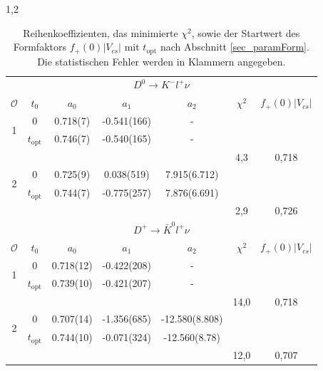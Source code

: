 \documentclass[11pt,a4paper,twoside]{report}
\begin{document}
\begin{spacing}{1,2}
 \renewcommand{\arraystretch}{1.2}
\begin{table}[h]
 \begin{tabular}{cc|ccccc}
 \toprule
  \multicolumn{7}{c}{$D^0 \rightarrow  K^- l^+ \nu$} \\
   $\mathcal{O}$ & $t_0$ & $a_0$ & $a_1$ & $a_2$ & $\chi^2$ & $f_+(0)|V_{cs}|$\\
   \midrule
   \multirow{2}{*}{1} & 0 & 0.718(7) & -0.541(166) & - &  &\\
   & $t_\text{opt}$ & 0.746(7) & -0.540(165) & -\\
   & & & &  & 4,3 &0,718 \\
   \hline
      \multirow{2}{*}{2} & 0 & 0.725(9) & 0.038(519) & 7.915(6.712) & &\\
   & $t_\text{opt}$ & 0.744(7) & -0.775(257) & 7.876(6.691)\\
     & & & & & 2,9&0,726 \\
     \midrule\midrule
   \multicolumn{7}{c}{$D^+ \rightarrow  \bar K^0 l^+ \nu$ } \\
   $\mathcal{O}$ & $t_0$ & $a_0$ & $a_1$ & $a_2$ & $\chi^2$ &$f_+(0)|V_{cs}|$\\
   \midrule
   \multirow{2}{*}{1} & 0 & 0.718(12) & -0.422(208) & - &  &\\
   & $t_\text{opt}$ & 0.739(10) & -0.421(207) & -\\
   & & & & & 14,0 & 0,718 \\
   \hline
      \multirow{2}{*}{2} & 0 & 0.707(14) & -1.356(685) & -12.580(8.808) &  &\\
   & $t_\text{opt}$ & 0.744(10) & -0.071(324) & -12.560(8.78)\\
     & & & & &12,0 &0,707 \\
     \bottomrule\bottomrule
 \end{tabular}
\caption[Reihenkoeffizienten, das minimierte $\chi^2$, sowie der Startwert des Formfaktors $f_+(0)|V_{cs}|$.]{Reihenkoeffizienten, das minimierte $\chi^2$, sowie der Startwert des Formfaktors $f_+(0)|V_{cs}|$ mit $t_\text{opt}$ nach Abschnitt \ref{sec_paramForm}. 
Die statistischen Fehler werden in Klammern angegeben.}
\label{tab_ResChiF0Ai}
\end{table}
 \renewcommand{\arraystretch}{1.0}

\noindent

\end{spacing}
\end{document}
